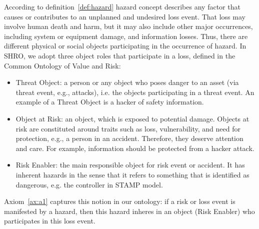 \documentclass[sw]{iosart2x}
\newcommand{\term}[1]{\textnormal{\textsf{#1}}}
\begin{document}
According to definition~\ref{def:hazard} hazard concept describes any factor that causes or contributes to an unplanned and undesired loss event. That loss may involve human death and harm, but it may also include other major occurrences, including system or equipment damage, and information losses. Thus, there are different physical or social objects participating in the occurrence of hazard. In SHRO, we adopt three object roles that participate in a loss, defined in the Common Ontology of Value and Risk: 
\begin{itemize}
    \item Threat Object: a person or any object who poses danger to an asset (via threat event, e.g., attacks), i.e. the objects participating in a threat event. An example of a Threat Object is a hacker of safety information.
    \item Object at Risk: an object, which is exposed to potential damage. Objects at risk are constituted around traits such as loss, vulnerability, and need for protection, e.g., a person in an accident. Therefore, they deserve attention and care. For example, information should be protected from a hacker attack.
    \item Risk Enabler: the main responsible object for risk event or accident. It has inherent hazards in the sense that it refers to something that is identified as dangerous, e.g. the controller in STAMP model.
\end{itemize}
Axiom~\ref{ax:a1} captures this notion in our ontology: if a risk or loss event is manifested by a hazard, then this hazard inheres in an object (Risk Enabler) who participates in this loss event.  
 
\end{document}
